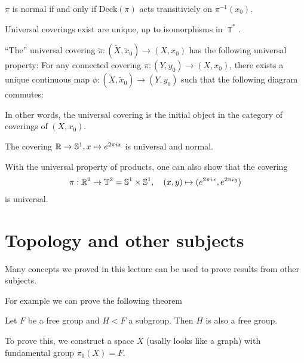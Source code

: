 \begin{rem}[]
  $\pi$ is normal if and only if $\text{Deck}(\pi)$ acts transitiviely on $\pi^{-1}(x_0)$.

  Universal coverings exist are unique, up to isomorphisms in $\Top^{\ast}$.

  ``The'' universal covering $\tilde{\pi}: (\tilde{X},\tilde{x}_0) \to (X,x_0)$ has the following universal property:
  For any connected covering $\pi:(Y,y_0) \to  (X,x_0)$, there exists a unique continuous map
  $\phi: (\tilde{X},\tilde{x}_0) \to  (Y,y_0)$ such that the following diagram commutes:

  \begin{center}
  \end{center}
  In other words, the universal covering is the initial object in the category of coverings of $(X,x_0)$.
\end{rem}



\begin{ex}[]
  The covering $\mathbb{R} \to \mathbb{S}^{1}, x \mapsto  e^{2 \pi i x}$ is universal and normal.

With the universal property of products, one can also show that the covering
\begin{align*}
  \pi: \mathbb{R}^{2} \to \mathbb{T}^{2} = \mathbb{S}^{1}\times \mathbb{S}^{1}, \quad (x,y) \mapsto (e^{2 \pi i x}, e^{2 \pi i y})
\end{align*}
is universal.
\end{ex}



\section{Topology and other subjects}
Many concepts we proved in this lecture can be used to prove results from other subjects.

For example we can prove the following theorem
\begin{thm}[]
Let $F$ be a free group and $H < F$ a subgroup. Then $H$ is also a free group.
\end{thm}
To prove this, we construct a space $X$ (usally looks like a graph) with fundamental group $\pi_1(X) = F$.

